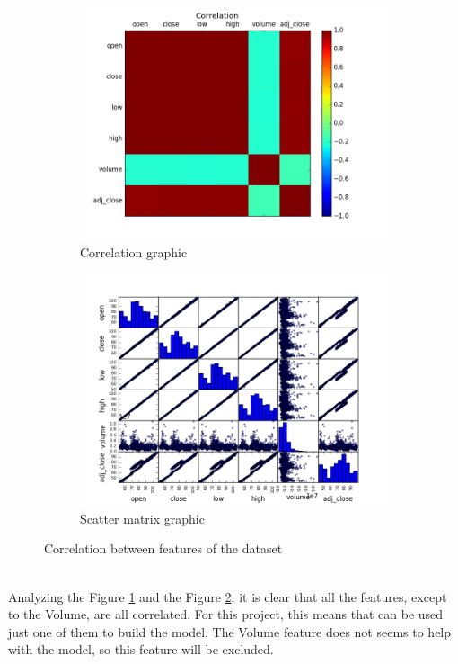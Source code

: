 \begin{figure}[H]
\centering
\begin{subfigure}{.5\textwidth}
  \centering
  \includegraphics[width=.8\linewidth]{figures/correlation_nvs.png}
  \caption{Correlation graphic}
  \label{fig:nvs_correlation}
\end{subfigure}%
\begin{subfigure}{.5\textwidth}
  \centering
  \includegraphics[width=.8\linewidth]{figures/scatter_matrix_nvs.png}
  \caption{Scatter matrix graphic}
  \label{fig:nvs_scatter_matrix}
\end{subfigure}
\caption{Correlation between features of the dataset}
\label{fig:features_correlation}
\end{figure}
\ \\
Analyzing the Figure \ref{fig:nvs_correlation} and the Figure \ref{fig:nvs_scatter_matrix}, it is clear that all the features, except to the Volume, are all correlated. For this project,
this means that can be used just one of them to build the model. The Volume feature does not seems to help with the model, so this feature will be excluded.
